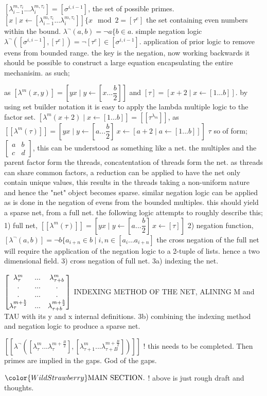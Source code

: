 $[\lambda^{m,\tau_i}_{i-1}...\lambda^{m,\tau_i}_{i}]=[\sigma^{i,i-1}]$, the set of possible primes. $[x\mid x\leftarrow[\lambda^{m,\tau_i}_{i-1}...\lambda^{m,\tau_i}_i]]\{x\mod{2}=[\tau^e]$
the set containing even numbers within the bound.
$\lambda^\neg(a,b) = \neg a \{b\in a$. simple negation logic
$\lambda^\neg([\sigma^{i,i-1}],[\tau^e])=\neg [\tau^e]\in [\sigma^{i,i-1}]$. application of prior logic to remove evens from bounded range.
the key is the negation, now working backwards it should be possible to construct a large equation encapsulating
the entire mechanisim. as such;


as $[\lambda^m(x,y)] = [yx\mid y\leftarrow[x...\dfrac{b}{2}]]$ and $[\tau] = [x+2\mid x\leftarrow[1...b]]$.
by using set builder notation it is easy to apply the lambda multiple logic to the
factor set. $[\lambda^m(x+2)\mid x\leftarrow [1...b]]=[[\tau^{\lambda_m}]]$, as
$[[\lambda^m(\tau)]]=[yx\mid y\leftarrow [a...\dfrac{b}{2}]\ x\leftarrow[a+2\mid a\leftarrow[1...b]]]$
$\tau$
so of form;  $\begin{bmatrix}
a&b\\
c&d
\end{bmatrix}$, this can be understood as something like a net. the multiples and the parent factor form the threads,
concatentation of threads form the net. as threads can share common factors, a reduction can be applied to have the net only
contain unique values, this results in the threads taking a non-uniform nature and hence the "net" object becomes sparse.
similar negation logic can be applied as is done in the negation of evens from the bounded multiples. this should yield a
sparse net, from a full net. the following logic attempts to roughly describe this;
1) full net, $[[\lambda^m(\tau)]]=[yx \mid y\leftarrow[a...\dfrac{b}{2}]\ x\leftarrow[\tau]]$
2) negation function,  $[\lambda^\neg(a,b)] = \neg b\{a_{i+n} \in b \mid i,n \in[a_i...a_{i+n}]$
the cross negation of the full net will require the application of the negation logic to a 2-tuple of lists.
hence a two dimensional field.
3) cross negation of full net.
3a) indexing the net.

$\begin{bmatrix} \lambda^m_\tau&...&\lambda^m_{\tau+b}\\.&...&.\\.&...&.\\
\lambda^{m+\tiny\frac{b}{2}}_\tau&...&\lambda^{m+\tiny\frac{b}{2}}_{\tau+b}\end{bmatrix}$
INDEXING METHOD OF THE NET, ALINING M and TAU with its y and x internal definitions.
3b) combining the indexing method and negation logic to produce a sparse net.

$[[\lambda^\neg([\lambda^m_\tau...\lambda^{m+\frac{B}{2}}_\tau],[\lambda^m_{\tau+1}...\lambda^{m+\frac{B}{2}}_{\tau+B}])] ]$ ! this needs to be completed. Then primes are implied in the gaps. God of the gaps.



$\color{WildStrawberry}\text{MAIN SECTION.}$ ! above is just rough draft and thoughts.

